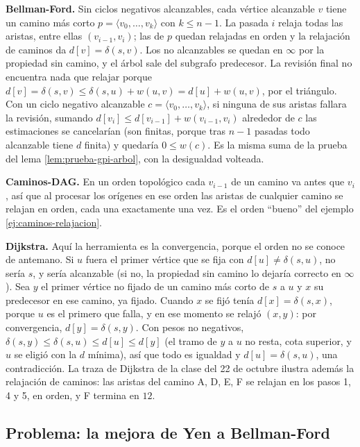 \documentclass[11pt,letterpaper]{article}
\begin{document}
\textbf{Bellman-Ford.} Sin ciclos negativos alcanzables, cada vértice
alcanzable $v$ tiene un camino más corto
$p = \langle v_0, \dots, v_k \rangle$ con $k \le n - 1$. La pasada $i$
relaja todas las aristas, entre ellas $(v_{i-1}, v_i)$; las de $p$
quedan relajadas en orden y la relajación de caminos da
$d[v] = \delta(s, v)$. Los no alcanzables se quedan en $\infty$ por
la propiedad sin camino, y el árbol sale del subgrafo predecesor. La
revisión final no encuentra nada que relajar porque
$d[v] = \delta(s, v) \le \delta(s, u) + w(u, v) = d[u] + w(u, v)$,
por el triángulo. Con un ciclo negativo alcanzable
$c = \langle v_0, \dots, v_k \rangle$, si ninguna de sus aristas
fallara la revisión, sumando $d[v_i] \le d[v_{i-1}] + w(v_{i-1}, v_i)$
alrededor de $c$ las estimaciones se cancelarían (son finitas, porque
tras $n - 1$ pasadas todo alcanzable tiene $d$ finita) y quedaría
$0 \le w(c)$. Es la misma suma de la prueba del lema
\ref{lem:prueba-gpi-arbol}, con la desigualdad volteada.

\textbf{Caminos-DAG.} En un orden topológico cada $v_{i-1}$ de un
camino va antes que $v_i$, así que al procesar los orígenes en ese
orden las aristas de cualquier camino se relajan en orden, cada una
exactamente una vez. Es el orden ``bueno'' del ejemplo
\ref{ej:caminos-relajacion}.

\textbf{Dijkstra.} Aquí la herramienta es la convergencia, porque el
orden no se conoce de antemano. Si $u$ fuera el primer vértice que se
fija con $d[u] \ne \delta(s, u)$, no sería $s$, y sería alcanzable
(si no, la propiedad sin camino lo dejaría correcto en $\infty$). Sea
$y$ el primer vértice no fijado de un camino más corto de $s$ a $u$ y
$x$ su predecesor en ese camino, ya fijado. Cuando $x$ se fijó tenía
$d[x] = \delta(s, x)$, porque $u$ es el primero que falla, y en ese
momento se relajó $(x, y)$: por convergencia, $d[y] = \delta(s, y)$.
Con pesos no negativos,
$\delta(s, y) \le \delta(s, u) \le d[u] \le d[y]$ (el tramo de $y$ a
$u$ no resta, cota superior, y $u$ se eligió con la $d$ mínima), así
que todo es igualdad y $d[u] = \delta(s, u)$, una contradicción. La
traza de Dijkstra de la clase del 22 de octubre ilustra además la
relajación de caminos: las aristas del camino A, D, E, F se relajan en
los pasos 1, 4 y 5, en orden, y F termina en $12$.


\subsection*{Problema: la mejora de Yen a Bellman-Ford}
\end{document}
